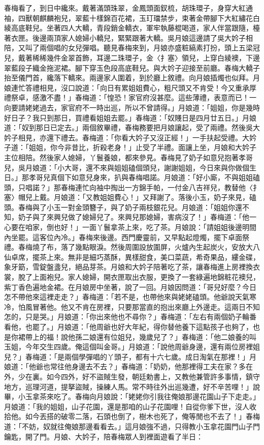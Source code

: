 春梅看了，到日中纔來。戴著滿頭珠翠，金鳳頭面釵梳，胡珠環子，身穿大紅通袖，四獸朝麒麟袍兒，翠藍十樣錦百花裙，玉玎璫禁步，束著金帶腳下大紅繡花白綾高底鞋兒。坐著四人大轎，青段銷金轎衣，軍牢執藤棍喝道，家人伴當跟隨，檯著衣匣。後邊兩頂家人媳婦小轎兒，緊緊跟著大轎。吳月娘這邊請了吳大妗子相陪，又叫了兩個唱的女兒彈唱。聽見春梅來到，月娘亦盛粧縞素打扮，頭上五梁冠兒，戴著稀稀幾件金翠首飾，耳邊二珠環子，金〈扌塞〉領兒，上穿白綾襖，下邊翠藍段子織金拖泥裙。腳下穿玉色段高底鞋兒。與大妗子迎接至前廳。春梅大轎子抬至儀門首，纔落下轎來。兩邊家人圍着，到於廳上敘禮。向月娘插燭也似拜。月娘連忙答禮相見，沒口說道：「向日有累姐姐費心，粗尺頭又不肯受！今又重承厚禮祭卓，感激不盡！」春梅道：「惶恐！家官府沒甚麼。這些薄禮，表意而已！一向要請姥姥過去，家官府不一時出巡，所以不曾請得。」月娘道：「姐姐，你是幾時好日子？我只到那日，買禮看姐姐去罷。」春梅道：「奴賤日是四月廿五日。」月娘道：「奴到那日已定去。」兩個敘畢禮，春梅務要把月娘讓起，受了兩禮。然後吳大妗子相見，亦還下禮去。春梅道：「你看大妗子又沒正經！」一手扶起受禮。大妗子道：「姐姐，你今非昔比，折殺老身！」止受了半禮。面讓上坐，月娘和大妗子主位相陪。然後家人媳婦，丫鬟養娘，都來參見。春梅見了奶子如意兒抱著孝哥兒，吳月娘道：「小大哥，還不來與姐姐磕個頭兒，謝謝姐姐，今日來與你做個生日。」那孝哥兒真個下如意兒身來，扒與春梅唱諾。月娘道：「好小廝，不與姐姐磕頭，只唱諾？」那春梅連忙向袖中掏出一方錦手帕，一付金八吉祥兒，教替他〈扌塞〉帽兒上戴。月娘道：「又教姐姐費心！」又拜謝了。落後小玉，奶子來見，磕頭。春梅與了小玉一對金頭簪子，與了奶子兩枝銀花兒。月娘道：「姐姐你還不知，奶子與了來興兒做了媳婦兒了。來興兒那媳婦，害病沒了！」春梅道：「他一心要在咱家，倒也好！」一面丫鬟拿茶上來，吃了茶。月娘說：「請姐姐後邊明間內坐罷。這客位內冷。」春梅來後邊。西門慶靈前，又早點起燈燭，擺下卓面祭禮。春梅燒了布，落了幾點眼淚。然後周圍設放圍屏，火爐內生起炭火，安放大八仙卓席，擺茶上來。無非是細巧蒸酥，異樣甜食，美口菜蔬，希奇果品，縷金碟，象牙筯，雪錠盤盞兒，絕品芽茶。月娘和大妗子陪著吃了茶，讓春梅進上房裡換衣裳，脫了上面袍兒。家人媳婦，開衣匣取出衣服，更換了一套綠遍地錦粧花襖兒，紫丁香色遍地金裙。在月娘房中坐著，說了一回。月娘因問道：「哥兒好麼？今日怎不帶他來這裡走走？」春梅道：「若不是，也帶他來與姥姥磕頭。他爺說天氣寒冷，怕風冒著他。他又不肯在房裡，只要那當直的抱出來廳上外邊走。這兩日不知怎的，只是哭。」月娘道：「你出來他也不尋你？」春梅道：「左右有兩個奶子輪番看他，也罷了。」月娘道：「他周爺也好大年紀，得你替他養下這點孩子也夠了，也是你裙帶上的福！說他孫二娘還有位姐兒，幾歲兒了？」春梅道：「他二娘養的叫玉姐，今年交生四歲。俺這個叫金哥。」月娘道：「說他周爺身邊，還有兩位房裡姐兒？」春梅道：「是兩個學彈唱的丫頭子，都有十六七歲。成日淘氣在那裡！」月娘道：「他爺也常往他身邊去不去？」春梅道：「奶奶，他那裡得工夫在家？多在外，少在裏。如今四外，好不盜賊生發，朝廷勅書上，又教他兼管許多事情，鎮守地方，巡理河道，提拏盜賊，操練人馬。常不時往外出巡幾遭，好不辛苦哩！」說畢，小玉拿茶來吃了。春梅向月娘說：「姥姥你引我往俺娘那邊花園山子下走走。」月娘道：「我的姐姐，山子花園，還是那咱的山子花園哩！自從你爹下世，沒人收拾他。如今丟搭的破零二落，石頭也倒了，樹木也死了，俺等閒也不去了！」春梅道：「不妨，奴就往俺娘那邊看看去。」這月娘強不過，只得教小玉拿花園門山子門鑰匙，開了門。月娘、大妗子，陪春梅眾人到裡面遊看了半日：

